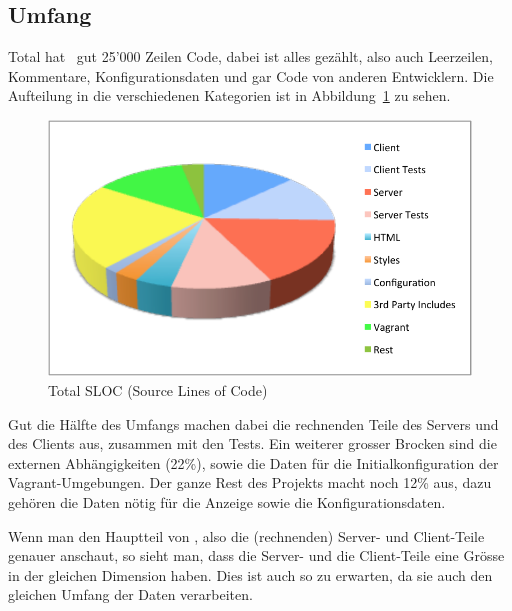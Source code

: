 	\subsection{Umfang}
	Total hat \eeppi\ gut 25'000 Zeilen Code, dabei ist alles gezählt,
	also auch Leerzeilen, Kommentare, Konfigurationsdaten und gar Code von anderen Entwicklern.
	Die Aufteilung in die verschiedenen Kategorien ist in Abbildung\ \ref{fig:TotalSLOC} zu sehen.
	\begin{figure}[H]
		\includegraphics[width=\largeThird\textwidth]{qualityManagement/media/img/totalSLOC.pdf}
		\centering
		\caption{Total SLOC (Source Lines of Code)}
		\label{fig:TotalSLOC}
	\end{figure}
	
	Gut die Hälfte des Umfangs machen dabei die rechnenden Teile des Servers und des Clients aus,
	zusammen mit den Tests.
	Ein weiterer grosser Brocken sind die externen Abhängigkeiten (22\%),
	sowie die Daten für die Initialkonfiguration der Vagrant-Umgebungen.
	Der ganze Rest des Projekts macht noch 12\% aus,
	dazu gehören die Daten nötig für die Anzeige sowie die Konfigurationsdaten.
	
	Wenn man den Hauptteil von \eeppi, also die (rechnenden) Server- und Client-Teile genauer anschaut,
	so sieht man, dass die Server- und die Client-Teile eine Grösse in der gleichen Dimension haben.
	Dies ist auch so zu erwarten, da sie auch den gleichen Umfang der Daten verarbeiten.
	
